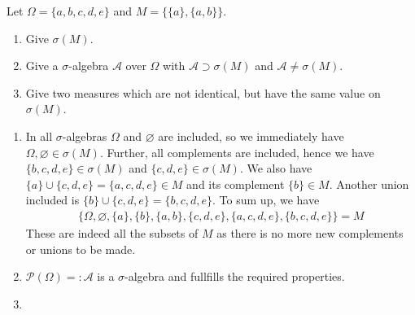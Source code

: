 \begin{question}
    Let \(\Omega = \{a, b, c, d, e\}\) and \(M = \{\{a\}, \{a, b\}\}\).
    \begin{enumerate}
        \item Give \(\sigma(M)\).
        \item Give a \(\sigma\)-algebra \(\mathcal{A}\) over \(\Omega\) with \(\mathcal{A} \supset \sigma (M)\) and \(\mathcal{A} \neq \sigma(M)\).
        \item Give two measures which are not identical, but have the same value on \(\sigma (M)\).
    \end{enumerate}
\end{question}
\begin{solution}
    \begin{enumerate}
        \item In all \(\sigma\)-algebras \(\Omega\) and \(\varnothing\) are included, so we immediately have \(\Omega, \varnothing \in \sigma (M)\). Further, all complements are included, hence we have \(\{b, c, d, e\} \in \sigma (M)\) and \(\{c, d, e\} \in \sigma (M)\). We also have \(\{a\} \cup \{c, d, e\} = \{a, c, d, e\} \in M\) and its complement \(\{b\} \in M\). Another union included is \(\{b\} \cup \{c, d, e\} = \{b, c, d,e\}\). To sum up, we have
        \begin{align}
            \{\Omega, \varnothing, \{a\}, \{b\}, \{a, b\}, \{c, d, e\}, \{a, c, d, e\}, \{b, c, d, e\}\} = M
        \end{align}
        These are indeed all the subsets of \(M\) as there is no more new complements or unions to be made.
        \item \(\mathcal{P}(\Omega) =: \mathcal{A}\) is a \(\sigma\)-algebra and fullfills the required properties.
        \item
    \end{enumerate}
\end{solution}